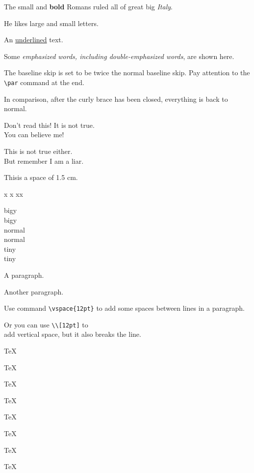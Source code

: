 \documentclass{article}
\begin{document}
{\small The small and
\textbf{bold} Romans ruled}
{\Large all of great big
{\itshape Italy}.}

He likes {\LARGE large and
{\small small} letters}.

An \underline{underlined} text.


Some \emph{emphasized words,
including \emph{double-emphasized}
words}, are shown here.

{\linespread{2.0}\selectfont
The baseline skip is set to be
twice the normal baseline skip.
Pay attention to the \verb|\par|
command at the end. \par}
In comparison, after the
curly brace has been closed,
everything is back to normal.

{\Large Don't read this!
It is not true.\\
You can believe me!\par}

{\Large This is not true either.\\
But remember I am a liar.}\par

This\hspace{1.5cm}is a space
of 1.5 cm.

x
x
x\hspace{\fill}x

{\noindent\Large big\hspace{1em}y}\\
{\Large big\quad y}\\
nor\hspace{2em}mal\\
nor\qquad mal\\
{\tiny tin\hspace{1em}y}\\
{\tiny tin\quad y}

A paragraph.
\vspace{2ex}

Another paragraph.

Use command \verb|\vspace{12pt}|
to add \vspace{12pt} some spaces
between lines in a paragraph.

Or you can use \verb|\\[12pt]|
to \\[12pt] add vertical space,
but it also breaks the line.

\parbox[t]{3em}{TeX\par TeX}
\parbox[t]{3em}{TeX\par\smallskip TeX}
\parbox[t]{3em}{TeX\par\medskip TeX}
\parbox[t]{3em}{TeX\par\bigskip TeX}
\end{document}
